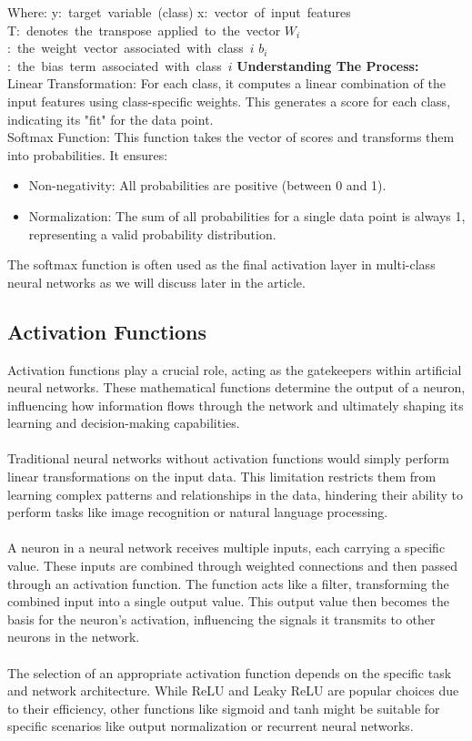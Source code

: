 \documentclass{article}
\begin{document}
\hbox{Where:}
\hbox{y: target variable (class)}
\hbox{x: vector of input features}
\hbox{T: denotes the transpose applied to the vector}
\hbox{${W_i}$: the weight vector associated with class ${i}$}
\hbox{${b_i}$: the bias term associated with class ${i}$}  \hfill\newline
\textbf{Understanding The Process:}\hfill\newline\\
Linear Transformation: For each class, it computes a linear combination of the input features using class-specific weights. This generates a score for each class, indicating its "fit" for the data point.\hfill\newline\\
Softmax Function: This function takes the vector of scores and transforms them into probabilities. It ensures:
\begin{itemize}
\item Non-negativity: All probabilities are positive (between 0 and 1).
\end{itemize}
\begin{itemize}
\item Normalization: The sum of all probabilities for a single data point is always 1, representing a valid probability distribution.
\end{itemize}
The softmax function is often used as the final activation layer in multi-class neural networks as we will discuss later in the article.

\subsection{Activation Functions}
Activation functions play a crucial role, acting as the gatekeepers within artificial neural networks. These mathematical functions determine the output of a neuron, influencing how information flows through the network and ultimately shaping its learning and decision-making capabilities.\\\\
Traditional neural networks without activation functions would simply perform linear transformations on the input data. This limitation restricts them from learning complex patterns and relationships in the data, hindering their ability to perform tasks like image recognition or natural language processing.\\\\
A neuron in a neural network receives multiple inputs, each carrying a specific value. These inputs are combined through weighted connections and then passed through an activation function. The function acts like a filter, transforming the combined input into a single output value. This output value then becomes the basis for the neuron's activation, influencing the signals it transmits to other neurons in the network.\\\\
The selection of an appropriate activation function depends on the specific task and network architecture. While ReLU and Leaky ReLU are popular choices due to their efficiency, other functions like sigmoid and tanh might be suitable for specific scenarios like output normalization or recurrent neural networks.
\end{document}
